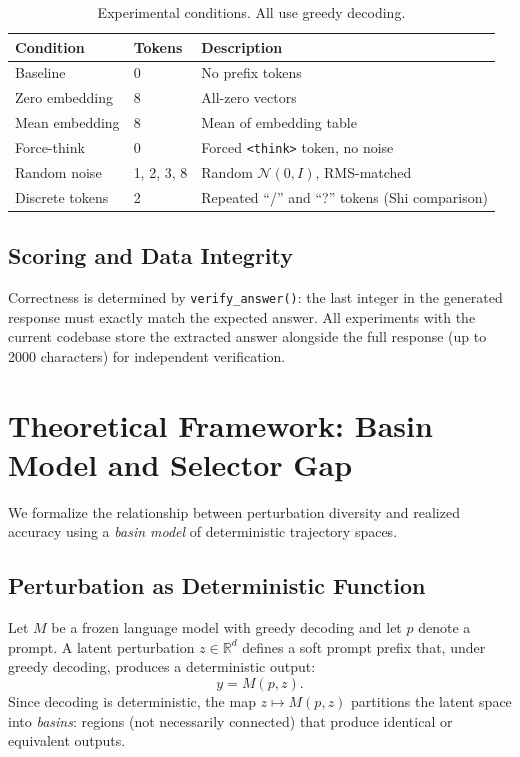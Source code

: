 \documentclass{article}
\begin{document}
\begin{table}[h]
\centering
\small
\begin{tabular}{llp{5cm}}
\toprule
\textbf{Condition} & \textbf{Tokens} & \textbf{Description} \\
\midrule
Baseline & 0 & No prefix tokens \\
Zero embedding & 8 & All-zero vectors \\
Mean embedding & 8 & Mean of embedding table \\
Force-think & 0 & Forced \texttt{<think>} token, no noise \\
Random noise & 1, 2, 3, 8 & Random $\mathcal{N}(0,I)$, RMS-matched \\
Discrete tokens & 2 & Repeated ``/'' and ``?'' tokens (Shi comparison) \\
\bottomrule
\end{tabular}
\caption{Experimental conditions. All use greedy decoding.}
\label{tab:conditions}
\end{table}

\subsection{Scoring and Data Integrity}

Correctness is determined by \texttt{verify\_answer()}: the last integer
in the generated response must exactly match the expected answer. All
experiments with the current codebase store the extracted answer alongside
the full response (up to 2000 characters) for independent verification.

\section{Theoretical Framework: Basin Model and Selector Gap}
\label{sec:theory}

We formalize the relationship between perturbation diversity and
realized accuracy using a \emph{basin model} of deterministic
trajectory spaces.

\subsection{Perturbation as Deterministic Function}

Let $M$ be a frozen language model with greedy decoding and let $p$
denote a prompt. A latent perturbation $z \in \mathbb{R}^d$ defines a
soft prompt prefix that, under greedy decoding, produces a deterministic
output:
\[
y = M(p, z).
\]
Since decoding is deterministic, the map $z \mapsto M(p, z)$ partitions
the latent space into \emph{basins}: regions (not necessarily connected)
that produce identical or equivalent outputs.
\end{document}
